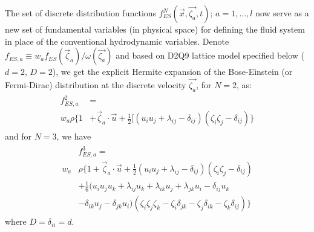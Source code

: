 \documentclass[doublecol]{epl2}
\begin{document}
The set of discrete distribution functions $f^N_{ES}(\vec{x},\vec{\zeta_a} ,t)$; $a =1,...,l$ now serve as a new set of fundamental variables (in physical space) for defining the fluid system in place of the conventional hydrodynamic variables.  Denote $f_{ES,a} \equiv w_{a} f_{ES}(\vec\zeta_a )/{\omega(\vec{\zeta_a})}$ and based on D2Q9 lattice model specified below ($d=2$, $D=2$), we get the explicit Hermite expansion of the Bose-Einstein (or Fermi-Dirac) distribution at the discrete velocity $\vec{\zeta_a}$, for $N=2$, as:
\begin{align}
\begin{split}
f_{ES,a}^{2} &=  \\
w_a \rho \{ 1 &+ \vec \zeta_a \cdot \vec u + \frac{1}{2} [( u_i u_j +\lambda_{ij} -\delta_{ij})(\zeta_i \zeta_j - \delta_{ij}) \}
\end{split}
\end{align}
and for $N=3$, we have
\begin{align}
\begin{split}
&f_{ES,a}^{3} =  \\
w_a &\rho \{ 1 + \vec \zeta_a \cdot \vec u + \frac{1}{2} ( u_i u_j +\lambda_{ij} -\delta_{ij})(\zeta_i \zeta_j - \delta_{ij}) \\
&+ \frac{1}{6} (u_{i} u_{j} u_{k} + \lambda_{i j} u_{k} + \lambda_{i k} u_{j} + \lambda_{j k} u_{i} - \delta_{i j} u_{k} \\
&- \delta_{i k} u_{j} - \delta_{j k} u_{i})(\zeta _{i} \zeta _{j} \zeta _{k}-\zeta _{i}\delta_{jk} -\zeta _{j}\delta _{ik} -\zeta _{k} \delta _{ij}) \}
\end{split}
\end{align}
where $D=\delta_{ii}=d$.
\end{document}

